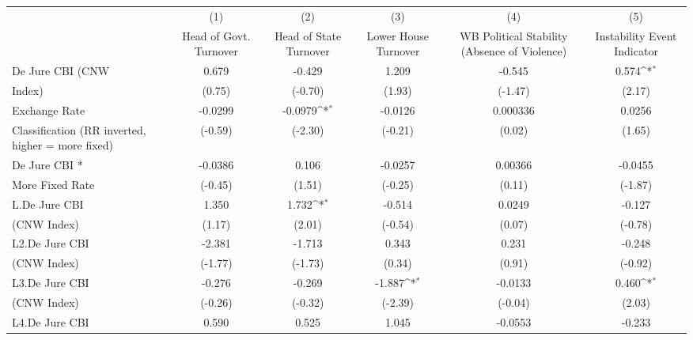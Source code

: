 {
\def\sym#1{\ifmmode^{#1}\else\(^{#1}\)\fi}
\begin{tabular}{l*{5}{c}}
\toprule
                &\multicolumn{1}{c}{(1)}&\multicolumn{1}{c}{(2)}&\multicolumn{1}{c}{(3)}&\multicolumn{1}{c}{(4)}&\multicolumn{1}{c}{(5)}\\
                &\multicolumn{1}{c}{Head of Govt. Turnover}&\multicolumn{1}{c}{Head of State Turnover}&\multicolumn{1}{c}{Lower House Turnover}&\multicolumn{1}{c}{WB Political Stability (Absence of Violence)}&\multicolumn{1}{c}{Instability Event Indicator}\\
\midrule
De Jure CBI (CNW&    0.679         &   -0.429         &    1.209         &   -0.545         &    0.574\sym{*}  \\
Index)          &   (0.75)         &  (-0.70)         &   (1.93)         &  (-1.47)         &   (2.17)         \\
\addlinespace
Exchange Rate   &  -0.0299         &  -0.0979\sym{*}  &  -0.0126         & 0.000336         &   0.0256         \\
Classification (RR inverted, higher = more fixed)&  (-0.59)         &  (-2.30)         &  (-0.21)         &   (0.02)         &   (1.65)         \\
\addlinespace
De Jure CBI *   &  -0.0386         &    0.106         &  -0.0257         &  0.00366         &  -0.0455         \\
More Fixed Rate &  (-0.45)         &   (1.51)         &  (-0.25)         &   (0.11)         &  (-1.87)         \\
\addlinespace
L.De Jure CBI   &    1.350         &    1.732\sym{*}  &   -0.514         &   0.0249         &   -0.127         \\
(CNW Index)     &   (1.17)         &   (2.01)         &  (-0.54)         &   (0.07)         &  (-0.78)         \\
\addlinespace
L2.De Jure CBI  &   -2.381         &   -1.713         &    0.343         &    0.231         &   -0.248         \\
(CNW Index)     &  (-1.77)         &  (-1.73)         &   (0.34)         &   (0.91)         &  (-0.92)         \\
\addlinespace
L3.De Jure CBI  &   -0.276         &   -0.269         &   -1.887\sym{*}  &  -0.0133         &    0.460\sym{*}  \\
(CNW Index)     &  (-0.26)         &  (-0.32)         &  (-2.39)         &  (-0.04)         &   (2.03)         \\
\addlinespace
L4.De Jure CBI  &    0.590         &    0.525         &    1.045         &  -0.0553         &   -0.233         \\

\end{tabular}}
